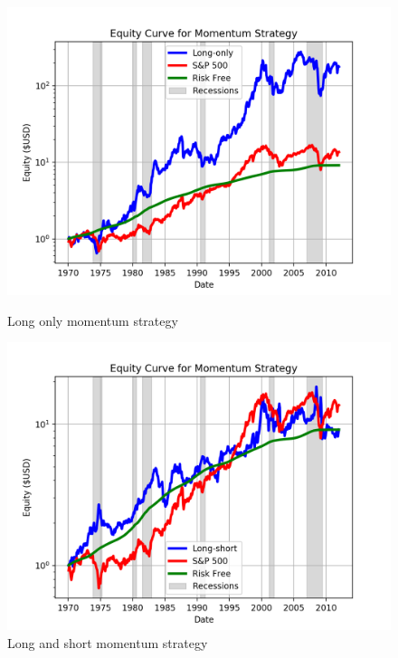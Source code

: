 \documentclass[10pt, letterpaper]{article}
\begin{document}
\begin{figure}[H]
    \centering
    \begin{minipage}{0.49\textwidth}
        \centering
        \includegraphics[width=\textwidth]{longonly.png} %
        \caption{Long only momentum strategy}
        \label{fig:longonly}
    \end{minipage}\hfill
    \begin{minipage}{0.49\textwidth}
        \centering
        \includegraphics[width=\textwidth]{longshort.png} %
        \caption{Long and short momentum strategy}
        \label{fig:longshort}
    \end{minipage}
\end{figure}
\end{document}
